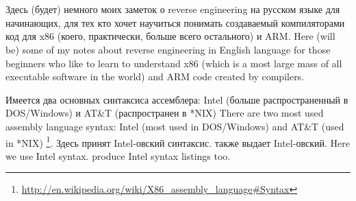 ﻿\chapter{}

\IFRU
{Здесь (будет) немного моих заметок о reverse engineering на русском языке для начинающих, 
для тех кто хочет научиться понимать создаваемый \CCpp компиляторами код для x86 (коего, 
практически, больше всего остального) и ARM.}
{Here (will be) some of my notes about reverse engineering in English language for 
those beginners who like to learn to understand x86 (which is a most large mass of 
all executable software in the world) and ARM code created by \CCpp compilers.}


\IFRU
{Имеется два основных синтаксиса ассемблера: Intel (больше распространенный в DOS/Windows) и 
AT\&T (распространен в *NIX)}
{There are two most used assembly language syntax: Intel (most used in DOS/Windows) and AT\&T (used in *NIX)}
\footnote{\url{http://en.wikipedia.org/wiki/X86_assembly_language\#Syntax}}. 
\IFRU
{Здесь принят Intel-овский синтаксис. \IDA также выдает Intel-овский.}
{Here we use Intel syntax. \IDA produce Intel syntax listings too.}
